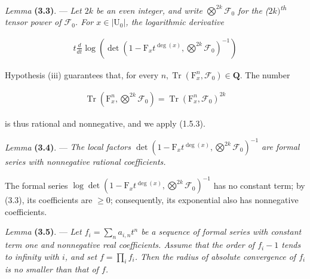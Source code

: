 \documentclass[10pt,leqno]{article}
\begin{document}
\noindent \emph{Lemma} \textbf{(3.3)}. — {\itshape Let \(2k\) be an even integer, and write \(\bigotimes\limits^{2k}\mathcal{F} _{0}\) for the (\(2k)\)\textsuperscript{th} tensor power of \(\mathcal{F} _{0}\). For \(x\in |\mathrm{U}_{0}|\), the logarithmic derivative}\par

\begin{equation*}\begin{gathered}t \frac{d}{dt} \operatorname{log}(\operatorname{det}(1- \mathrm{F}_{x} t^{\operatorname{deg}(x)},\bigotimes\limits^{2k}\mathcal{F} _{0})^{- 1})\end{gathered}\end{equation*}

\par

\noindent Hypothesis (iii) guarantees that, for every \(n, \operatorname{Tr}(\mathrm{F}_{x}^{n},\mathcal{F} _{0})\in \mathbf{Q}\). The number\par

\begin{equation*}\begin{gathered}\operatorname{Tr}(\mathrm{F}_{x}^{n},\bigotimes\limits^{2k}\mathcal{F} _{0}) = \operatorname{Tr}(\mathrm{F}_{x}^{n},\mathcal{F} _{0})^{2k}\end{gathered}\end{equation*}

\noindent is thus rational and nonnegative, and we apply (1.5.3).\par

\noindent \emph{Lemma} \textbf{(3.4)}. — {\itshape The local factors \(\operatorname{det}(1- \mathrm{F}_{x} t^{\operatorname{deg}(x)},\bigotimes\limits^{2k}\mathcal{F} _{0})^{- 1}\) are formal series with nonnegative rational coefficients.}\par

\noindent The formal series \(\operatorname{log} \operatorname{det}(1- \mathrm{F}_{x} t^{\operatorname{deg}(x)},\bigotimes\limits^{2k}\mathcal{F} _{0})^{- 1}\) has no constant term; by (3.3), its coefficients are \(\geq 0\); consequently, its exponential also has nonnegative coefficients.\par

\noindent \emph{Lemma} \textbf{(3.5)}. — {\itshape Let \(f_{i}=\sum _{n} a_{i,n}t^{n}\) be a sequence of formal series with constant term one and nonnegative real coefficients. Assume that the order of \(f_{i}- 1\) tends to infinity with \(i\), and set \(f=\prod _{i} f_{i}\). Then the radius of absolute convergence of \(f_{i}\) is no smaller than that of \(f\).}\par
\end{document}
